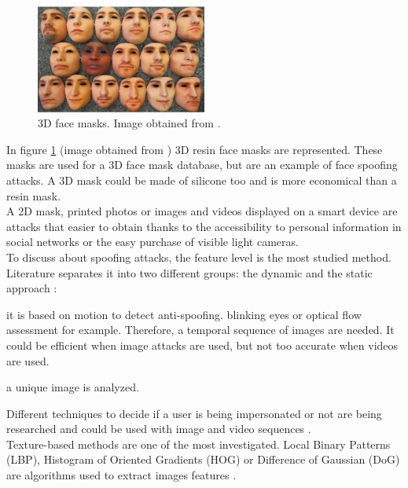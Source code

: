 \begin{figure}[htb]
\centering
\includegraphics[width=0.5\textwidth]{images_miscelaneus/fig_masks.png}
\caption{3D face masks. Image obtained from \cite{3dmask}.} \label{fig:3dMasks}
\end{figure}

In figure \ref{fig:3dMasks} (image obtained from \cite{3dmask}) 3D resin face masks  are represented. These masks are used for a 3D face mask database, but are an example of face spoofing attacks. A 3D mask could be made of silicone too and is more economical than a resin mask.\\

A 2D mask, printed photos or images and videos displayed on a smart device are attacks that easier to obtain thanks to the accessibility to personal information in social networks or the easy purchase of visible light cameras.\\

To discuss about spoofing attacks, the feature level is the most studied method. Literature separates it into two different groups: the dynamic and the static approach \cite{Spoofing_survey}:
\begin{description}[itemsep=2pt,topsep=8pt,parsep=0pt,partopsep=20pt]
\item[Dynamic:] it is based on motion to detect anti-spoofing. blinking eyes or optical flow assessment for example. Therefore, a temporal sequence of images are needed. It could be efficient when image attacks are used, but not too accurate when videos are used.
\item[Static:] a unique image is analyzed.
\end{description}

Different techniques to decide if a user is being impersonated or not are being researched and could be used with image and video sequences \cite{Spoofing_survey}.\\

Texture-based methods are one of the most investigated. Local Binary Patterns (LBP),  Histogram of Oriented Gradients (HOG) or Difference of Gaussian (DoG) are algorithms used to extract images features \cite{distorsion,Spoofing_survey}.\\

